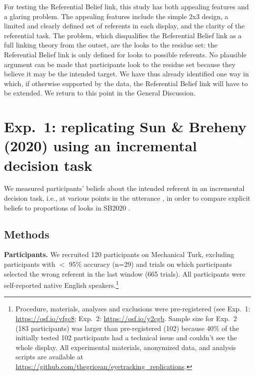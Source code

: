 \documentclass[10pt,letterpaper]{article}
\begin{document}
For  testing the Referential Belief link, this study has both appealing features and a glaring problem. The appealing features include the simple 2x3 design, a limited and clearly defined set of referents in each display, and the clarity of the referential task. The  problem, which disqualifies the Referential Belief link as a full linking theory from the outset, are the  looks to the residue set: the Referential Belief link is only defined for looks to possible referents. No plausible argument can be made that participants look to the residue set because they believe it may be the intended target.  We have thus already identified one way in which, if otherwise supported by the data, the Referential Belief link will have to be extended. We return to this point in the General Discussion.


\section{Exp.~1: replicating Sun \& Breheny (2020) using an incremental decision task}

We measured participants' beliefs about the intended referent  in  an incremental decision task, i.e., at various points in the utterance \cite{Allopenna1998,QingLD2018, KreissDegen2020}, in order to compare explicit beliefs to proportions of looks in SB2020 . 

\subsection{Methods}

\textbf{Participants.} We recruited 120 participants on Mechanical Turk, excluding participants with $<$ 95\% accuracy (n=29) and trials on which participants selected the wrong referent in the last window (665 trials). All participants were self-reported native English speakers.\footnote{Procedure, materials, analyses and exclusions were pre-registered (see Exp.~1: \url{https://osf.io/vfgc8}; Exp.~2: \url{https://osf.io/y2cgb}. Sample size for Exp.~2 (183 participants) was larger than pre-registered (102) because 40\% of the initially tested 102 participants had a technical issue and couldn't see the whole display. All experimental materials, anonymized data, and analysis scripts are available at \url{https://github.com/thegricean/eyetracking_replications}.}
\end{document}
